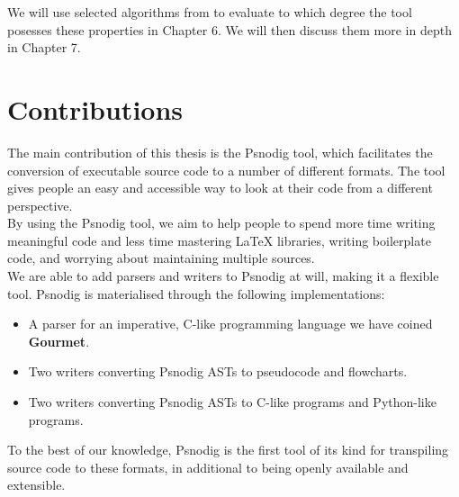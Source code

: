 We will use selected algorithms from \cite{pseudocodeInBook2} to evaluate to which degree the tool posesses these properties in Chapter 6. We will then discuss them more in depth in Chapter 7.

\section{Contributions}

The main contribution of this thesis is the Psnodig tool, which facilitates the conversion of executable source code to a number of different formats. The tool gives people an easy and accessible way to look at their code from a different perspective. \\

By using the Psnodig tool, we aim to help people to spend more time writing meaningful code and less time mastering LaTeX libraries, writing boilerplate code, and worrying about maintaining multiple sources. \\

We are able to add parsers and writers to Psnodig at will, making it a flexible tool. Psnodig is materialised through the following implementations:

\begin{itemize}
    \item A parser for an imperative, C-like programming language we have coined \textbf{Gourmet}.
    \item Two writers converting Psnodig ASTs to pseudocode and flowcharts.
    \item Two writers converting Psnodig ASTs to C-like programs and Python-like programs.
\end{itemize}

To the best of our knowledge, Psnodig is the first tool of its kind for transpiling source code to these formats, in additional to being openly available and extensible.



